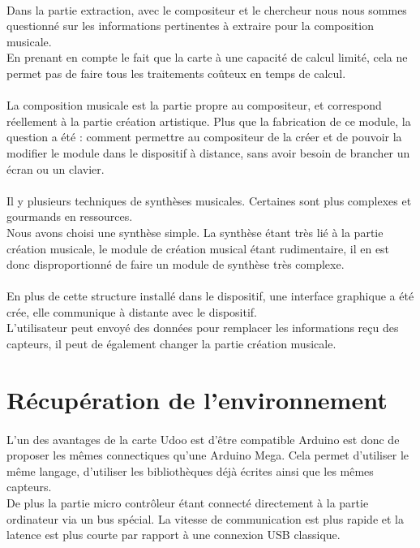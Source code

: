 \documentclass[a4paper, titlepage, oneside, 12pt]{article}%
\begin{document}
\paragraph{}
Dans la partie extraction, avec le compositeur et le chercheur nous nous sommes questionné sur les informations pertinentes à extraire pour la composition musicale.\\ 
En prenant en compte le fait que la carte à une capacité de calcul limité, cela ne permet pas de faire tous les traitements coûteux en temps de calcul.

\paragraph{}
La composition musicale est la partie propre au compositeur, et correspond réellement à la partie création artistique. Plus que la fabrication de ce module, la question a été :  comment permettre au compositeur de la créer et de pouvoir la modifier le module dans le dispositif à distance, sans avoir besoin  de brancher un écran ou un clavier.

\paragraph{}
Il y plusieurs techniques de synthèses musicales. Certaines sont plus complexes et gourmands en ressources.\\ Nous avons choisi une synthèse simple. La synthèse étant très lié à la partie création musicale, le module de création musical étant rudimentaire, il en est donc disproportionné de faire un module de synthèse très complexe. 

\paragraph{}
En plus de cette structure installé dans le dispositif, une interface graphique a été crée, elle communique à distante avec le dispositif.\\
L'utilisateur peut envoyé des données pour remplacer les informations reçu des capteurs, il peut de également changer la partie création musicale.

\section{Récupération de l'environnement}
\paragraph{}
L'un des avantages de la carte Udoo est d'être compatible Arduino est donc de proposer les mêmes connectiques qu'une Arduino Mega. Cela permet d'utiliser le même langage, d'utiliser les bibliothèques déjà écrites ainsi que les mêmes capteurs.\\
De plus la partie  micro contrôleur étant connecté directement à la partie ordinateur via un bus spécial. La vitesse de communication est plus rapide et la latence est plus courte par rapport à une connexion USB classique.
\end{document}
